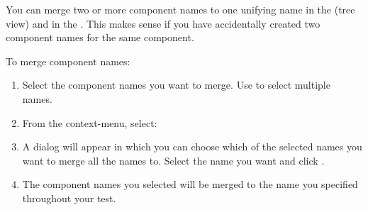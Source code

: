 
You can merge two or more component names to one unifying name in the \gdomeditor{} (tree view) and in the \gdcompnamebrowser{}. This makes sense if you have accidentally created two component names for the same component. 


To merge component names:
\begin{enumerate}
\item Select the component names you want to merge. Use  to select multiple names. 
\item From the context-menu, select:\\
\item A dialog will appear in which you can choose which of the selected names you want to merge all the names to. Select the name you want and click . 
\item The component names you selected will be merged to the name you specified throughout your test. 
\end{enumerate}
